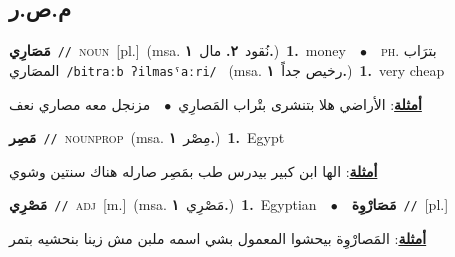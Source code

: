 \documentclass[10pt,a4paper,twoside]{article} %
\begin{document}
\begin{multicols}{2}
\vspace{-3mm}
\subsection*{\color{blue}\foreignlanguage{arabic}{م.ص.ر}\color{blue}{}} 

{\setlength\topsep{0pt}\textbf{\foreignlanguage{arabic}{مَصَارِي}}\ {\color{gray}\texttt{//}\color{black}}\ \textsc{noun}\ [pl.]\ \color{gray}(msa. \foreignlanguage{arabic}{نُقود}~\foreignlanguage{arabic}{\textbf{٢.}}  \foreignlanguage{arabic}{مال}~\foreignlanguage{arabic}{\textbf{١.}})\color{black}\ \textbf{1.}~money\ \ $\bullet$\ \ \textsc{ph.} \color{gray} \foreignlanguage{arabic}{بترَاب المصَاري}\color{black}\ {\color{gray}\texttt{/{\sffamily bitraːb ʔilmasˤaːri}/}\color{black}}\ \color{gray} (msa. \foreignlanguage{arabic}{رخيص جداً}~\foreignlanguage{arabic}{\textbf{١.}})\color{black}\ \textbf{1.}~very cheap\  \begin{flushright}\color{gray}\foreignlanguage{arabic}{\textbf{\underline{\foreignlanguage{arabic}{أمثلة}}}: الأراضي هلا بتنشرى بتْراب المَصارِي\ $\bullet$\ \  مزنجل معه مصاري نعف}\end{flushright}\color{black}} \vspace{2mm}

{\setlength\topsep{0pt}\textbf{\foreignlanguage{arabic}{مَصِر}}\ {\color{gray}\texttt{//}\color{black}}\ \textsc{noun\textunderscore prop}\ \color{gray}(msa. \foreignlanguage{arabic}{مِصْر}~\foreignlanguage{arabic}{\textbf{١.}})\color{black}\ \textbf{1.}~Egypt\  \begin{flushright}\color{gray}\foreignlanguage{arabic}{\textbf{\underline{\foreignlanguage{arabic}{أمثلة}}}: الها ابن كبير بيدرس طب بمَصِر صارله هناك سنتين وشوي}\end{flushright}\color{black}} \vspace{2mm}

{\setlength\topsep{0pt}\textbf{\foreignlanguage{arabic}{مَصْرِي}}\ {\color{gray}\texttt{//}\color{black}}\ \textsc{adj}\ [m.]\ \color{gray}(msa. \foreignlanguage{arabic}{مَصْرِي}~\foreignlanguage{arabic}{\textbf{١.}})\color{black}\ \textbf{1.}~Egyptian\ \ $\bullet$\ \ \setlength\topsep{0pt}\textbf{\foreignlanguage{arabic}{مَصَارْوِة}}\ {\color{gray}\texttt{//}\color{black}}\ [pl.]\  \begin{flushright}\color{gray}\foreignlanguage{arabic}{\textbf{\underline{\foreignlanguage{arabic}{أمثلة}}}: المَصارْوِة بيحشوا المعمول بشي اسمه ملبن مش زينا بنحشيه بتمر}\end{flushright}\color{black}} \vspace{2mm}


\end{multicols}
\end{document}

